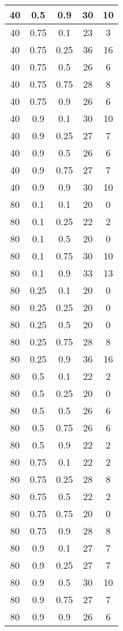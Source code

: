 \documentclass{bmstu}
\begin{document}
\begin{center}
\begin{longtable}[c]{|c|c|c|c|c|}
40 & 0.5 & 0.9 & 30 & 10 \\\hline
40 & 0.75 & 0.1 & 23 & 3 \\\hline
40 & 0.75 & 0.25 & 36 & 16 \\\hline
40 & 0.75 & 0.5 & 26 & 6 \\\hline
40 & 0.75 & 0.75 & 28 & 8 \\\hline
40 & 0.75 & 0.9 & 26 & 6 \\\hline
40 & 0.9 & 0.1 & 30 & 10 \\\hline
40 & 0.9 & 0.25 & 27 & 7 \\\hline
40 & 0.9 & 0.5 & 26 & 6 \\\hline
40 & 0.9 & 0.75 & 27 & 7 \\\hline
40 & 0.9 & 0.9 & 30 & 10 \\\hline
80 & 0.1 & 0.1 & 20 & 0 \\\hline
80 & 0.1 & 0.25 & 22 & 2 \\\hline
80 & 0.1 & 0.5 & 20 & 0 \\\hline
80 & 0.1 & 0.75 & 30 & 10 \\\hline
80 & 0.1 & 0.9 & 33 & 13 \\\hline
80 & 0.25 & 0.1 & 20 & 0 \\\hline
80 & 0.25 & 0.25 & 20 & 0 \\\hline
80 & 0.25 & 0.5 & 20 & 0 \\\hline
80 & 0.25 & 0.75 & 28 & 8 \\\hline
80 & 0.25 & 0.9 & 36 & 16 \\\hline
80 & 0.5 & 0.1 & 22 & 2 \\\hline
80 & 0.5 & 0.25 & 20 & 0 \\\hline
80 & 0.5 & 0.5 & 26 & 6 \\\hline
80 & 0.5 & 0.75 & 26 & 6 \\\hline
80 & 0.5 & 0.9 & 22 & 2 \\\hline
80 & 0.75 & 0.1 & 22 & 2 \\\hline
80 & 0.75 & 0.25 & 28 & 8 \\\hline
80 & 0.75 & 0.5 & 22 & 2 \\\hline
80 & 0.75 & 0.75 & 20 & 0 \\\hline
80 & 0.75 & 0.9 & 28 & 8 \\\hline
80 & 0.9 & 0.1 & 27 & 7 \\\hline
80 & 0.9 & 0.25 & 27 & 7 \\\hline
80 & 0.9 & 0.5 & 30 & 10 \\\hline
80 & 0.9 & 0.75 & 27 & 7 \\\hline
80 & 0.9 & 0.9 & 26 & 6 \\\hline

\end{longtable}
\end{center}
\end{document}
